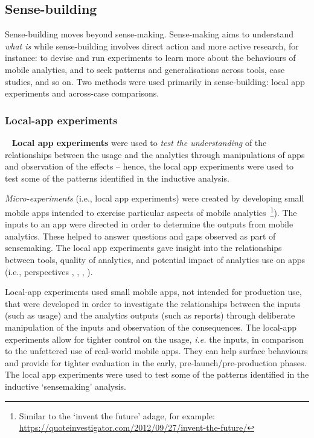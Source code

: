 \subsection{Sense-building}

Sense-building moves beyond sense-making. Sense-making aims to understand \textit{what is} while sense-building involves direct action and more active research, for instance: to devise and run experiments to learn more about the behaviours of mobile analytics, and to seek patterns and generalisations across tools, case studies, and so on. Two methods were used primarily in sense-building: local app experiments and across-case comparisons. 

\subsubsection{Local-app experiments}~\label{local-app-experiments-research-method} 
\textbf{Local app experiments} were used to \textit{test the understanding} of the relationships between the usage and the analytics through manipulations of apps and observation of the effects -- hence, the local app experiments were used to test some of the patterns identified in the inductive analysis.

\textit{Micro-experiments} (i.e., local app experiments) were created by developing small mobile apps intended to exercise particular aspects of mobile analytics~\footnote{Similar to the `invent the future' adage, for example: \url{https://quoteinvestigator.com/2012/09/27/invent-the-future/}}). The inputs to an app were directed in order to determine the outputs from mobile analytics. These helped to answer questions and gaps observed as part of sensemaking.  The local app experiments gave insight into the relationships between tools, quality of analytics, and potential impact of analytics use on apps (i.e., perspectives \uartefacts, \utools, \iartefacts, \itools). 

Local-app experiments used small mobile apps, not intended for production use, that were developed in order to investigate the relationships between the inputs (such as usage) and the analytics outputs (such as reports) through deliberate manipulation of the inputs and observation of the consequences.  
 The local-app experiments allow for tighter control on the usage, \textit{i.e.} the inputs, in comparison to the unfettered use of real-world mobile apps. They can help surface behaviours and provide for tighter evaluation in the early, pre-launch/pre-production phases. %
The local app experiments were used to test some of the patterns identified in the inductive `sensemaking' analysis.

